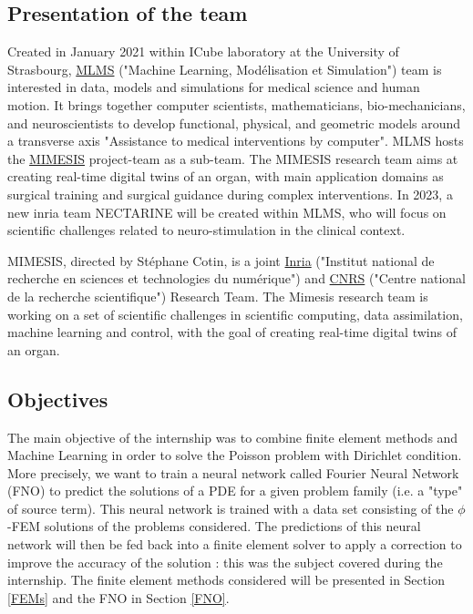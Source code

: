 \subsection{Presentation of the team}

Created in January 2021 within ICube laboratory at the University of Strasbourg, \href{https://mlms.icube.unistra.fr/en/index.php/Presentation}{MLMS} ("Machine Learning, Modélisation et Simulation") team is interested in data, models and simulations for medical science and human motion. It brings together computer scientists, mathematicians, bio-mechanicians, and neuroscientists to develop functional, physical, and geometric models around a transverse axis "Assistance to medical interventions by computer". MLMS hosts the \href{https://mimesis.inria.fr/}{MIMESIS} project-team as a sub-team. The MIMESIS research team aims at creating real-time digital twins of an organ, with main application domains as surgical training and surgical guidance during complex interventions. In 2023, a new inria team NECTARINE will be created within MLMS, who will focus on scientific challenges related to neuro-stimulation in the clinical context. 

MIMESIS, directed by Stéphane Cotin, is a joint \href{https://www.inria.fr/fr}{Inria} ("Institut national de recherche en sciences et technologies du numérique") and \href{https://www.cnrs.fr/fr}{CNRS} ("Centre national de la recherche scientifique") Research Team. The Mimesis research team is working on a set of scientific challenges in scientific computing, data assimilation, machine learning and control, with the goal of creating real-time digital twins of an organ.

\subsection{Objectives}

The main objective of the internship was to combine finite element methods and Machine Learning in order to solve the Poisson problem with Dirichlet condition. More precisely, we want to train a neural network called Fourier Neural Network (FNO) \cite{li_fourier_2021} to predict the solutions of a PDE for a given problem family (i.e. a "type" of source term). This neural network is trained with a data set consisting of the $\phi$-FEM solutions of the problems considered. The predictions of this neural network will then be fed back into a finite element solver to apply a correction to improve the accuracy of the solution : this was the subject covered during the internship. The finite element methods considered will be presented in Section \ref{FEMs} and the FNO in Section \ref{FNO}.

